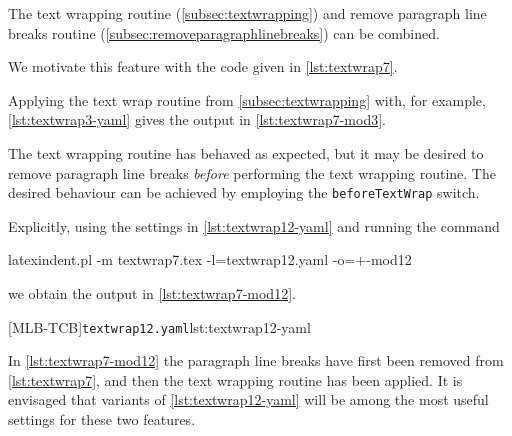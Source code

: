 	The%
	 text wrapping
	routine (\vref{subsec:textwrapping}) and remove paragraph line breaks routine
	(\vref{subsec:removeparagraphlinebreaks}) can be combined.

	We motivate this feature with the code given in \cref{lst:textwrap7}.


	Applying the text wrap routine from \vref{subsec:textwrapping} with, for example,
	\vref{lst:textwrap3-yaml} gives the output in \cref{lst:textwrap7-mod3}.


	The text wrapping routine has behaved as expected, but it may be desired to remove
	paragraph line breaks \emph{before} performing the text wrapping routine.
	The desired behaviour can be achieved by employing the \texttt{beforeTextWrap}
	switch.

	Explicitly, using the settings in \cref{lst:textwrap12-yaml} and running the command
	\begin{commandshell}
latexindent.pl -m textwrap7.tex -l=textwrap12.yaml -o=+-mod12
\end{commandshell}
	we obtain the output in \cref{lst:textwrap7-mod12}.

	\begin{cmhtcbraster}
		[MLB-TCB]{\texttt{textwrap12.yaml}}{lst:textwrap12-yaml}
	\end{cmhtcbraster}

	In \cref{lst:textwrap7-mod12} the paragraph line breaks have first been removed from
	\cref{lst:textwrap7}, and then the text wrapping routine has been applied. It is
	envisaged that variants of \cref{lst:textwrap12-yaml} will be among the most useful
	settings for these two features.


